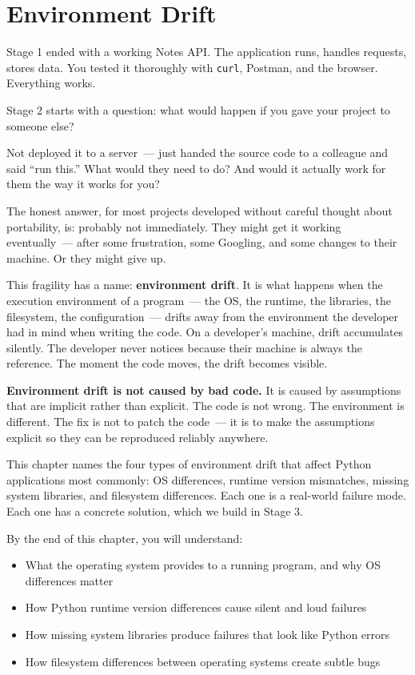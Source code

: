 \setcounter{chapter}{6}
\chapter{Environment Drift}\label{ch:07-environment-drift}

\chapterrule

Stage 1 ended with a working Notes API. The application runs, handles requests, stores data. You tested it thoroughly with \texttt{curl}, Postman, and the browser. Everything works.

Stage 2 starts with a question: what would happen if you gave your project to someone else?

Not deployed it to a server~--- just handed the source code to a colleague and said ``run this.'' What would they need to do? And would it actually work for them the way it works for you?

The honest answer, for most projects developed without careful thought about portability, is: probably not immediately. They might get it working eventually~--- after some frustration, some Googling, and some changes to their machine. Or they might give up.

This fragility has a name: \textbf{environment drift}. It is what happens when the execution environment of a program~--- the OS, the runtime, the libraries, the filesystem, the configuration~--- drifts away from the environment the developer had in mind when writing the code. On a developer's machine, drift accumulates silently. The developer never notices because their machine is always the reference. The moment the code moves, the drift becomes visible.

\textbf{Environment drift is not caused by bad code.} It is caused by assumptions that are implicit rather than explicit. The code is not wrong. The environment is different. The fix is not to patch the code~--- it is to make the assumptions explicit so they can be reproduced reliably anywhere.

This chapter names the four types of environment drift that affect Python applications most commonly: OS differences, runtime version mismatches, missing system libraries, and filesystem differences. Each one is a real-world failure mode. Each one has a concrete solution, which we build in Stage 3.

\begin{objectives}

By the end of this chapter, you will understand:

\begin{itemize}
\tightlist
\item
  What the operating system provides to a running program, and why OS differences matter
\item
  How Python runtime version differences cause silent and loud failures
\item
  How missing system libraries produce failures that look like Python errors
\item
  How filesystem differences between operating systems create subtle bugs
\end{itemize}

\end{objectives}

